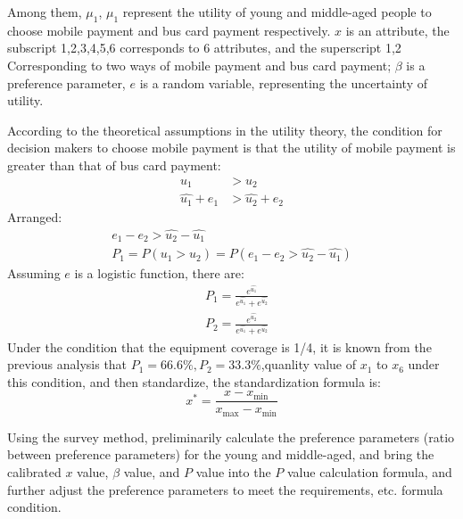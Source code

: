 \documentclass[../mcmpaper]{subfiles}
\begin{document}
Among them, $\mu_{1}$, $\mu_1$ represent the utility of young and middle-aged people to choose mobile payment and bus card payment respectively. $x$ is an attribute, the subscript {1,2,3,4,5,6} corresponds to 6 attributes, and the superscript {1,2} Corresponding to two ways of mobile payment and bus card payment; $\beta$ is a preference parameter, $e$ is a random variable, representing the uncertainty of utility.
\par
According to the theoretical assumptions in the utility theory, the condition for decision makers to choose mobile payment is that the utility of mobile payment is greater than that of bus card payment:
\begin{equation}
\begin{aligned}
u_{1} &>u_{2} \\
\widehat{u_{1}}+e_{1} &>\widehat{u_{2}}+e_{2}
\end{aligned}
\end{equation}
Arranged:
\begin{equation}
\begin{gathered}
e_{1}-e_{2}>\widehat{u_{2}}-\widehat{u_{1}} \\
P_{1}=P\left(u_{1}>u_{2}\right)=P\left(e_{1}-e_{2}>\widehat{u_{2}}-\widehat{u_{1}}\right)
\end{gathered}
\end{equation}
Assuming $e$ is a logistic function, there are:
\begin{equation}
\begin{aligned}
&P_{1}=\frac{e^{\widehat{u_{1}}}}{e^{\widehat{u_{1}}}+e^{\widehat{u_{2}}}} \\
&P_{2}=\frac{e^{\widehat{u_{2}}}}{e^{\widehat{u_{1}}}+e^{\widehat{u_{2}}}}
\end{aligned}
\end{equation}
Under the condition that the equipment coverage is 1/4, it is known from the previous analysis that $P_1=66.6\%, P_2=33.3\%$,quanlity value of $x_1$ to $x_6$ under this condition, and then standardize, the standardization formula is:
\begin{equation}
x^{*}=\frac{x-x_{\min }}{x_{\max }-x_{\min }}
\end{equation}
\par
Using the survey method, preliminarily calculate the preference parameters (ratio between preference parameters) for the young and middle-aged, and bring the calibrated $x$ value, $\beta$ value, and $P$ value into the $P$ value calculation formula, and further adjust the preference parameters to meet the requirements, etc. formula condition.
\end{document}
